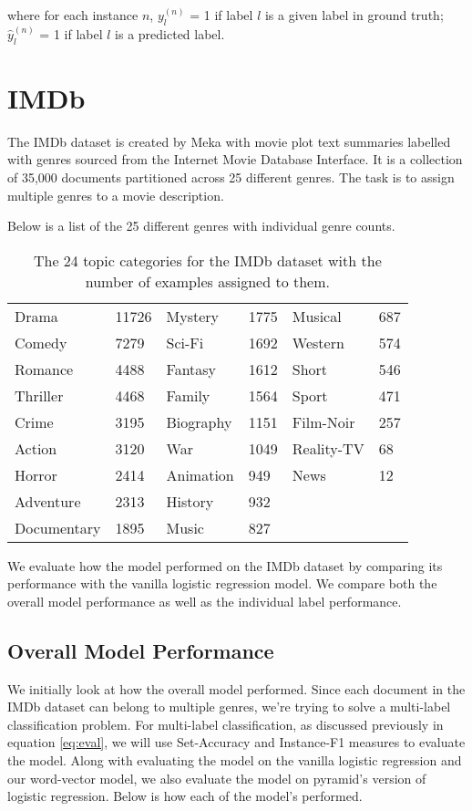 \noindent where for each instance $n$, $y^{(n)}_{l}$ = 1 if label $l$ is a given label in ground truth; \\
$\hat{y}^{(n)}_{l}$ = 1 if label $l$ is a predicted label.

\section{IMDb}

The IMDb dataset is created by Meka with movie plot text summaries labelled with genres sourced from the Internet Movie Database Interface. It is a collection of 35,000 documents partitioned across 25 different genres. The task is to assign multiple genres to a movie description.

Below is a list of the 25 different genres with individual genre counts.

\begin{table}[htbp]
\centering
\begin{tabular}{ll|ll|ll}
Drama & 11726 & Mystery & 1775 & Musical & 687 \\
Comedy & 7279 & Sci-Fi & 1692 & Western & 574 \\
Romance & 4488 & Fantasy & 1612 & Short & 546 \\
Thriller & 4468 & Family & 1564 & Sport & 471 \\
Crime & 3195 & Biography & 1151 & Film-Noir & 257 \\
Action & 3120 & War & 1049 & Reality-TV & 68 \\
Horror & 2414 & Animation & 949 & News & 12 \\
Adventure & 2313 & History & 932 &  &  \\
Documentary & 1895 & Music & 827 &  & 
\end{tabular}
\caption{\label{tab:widgets}The 24 topic categories for the IMDb dataset with the number of examples assigned to them.}
\end{table}

We evaluate how the model performed on the IMDb dataset by comparing its performance with the vanilla logistic regression model. We compare both the overall model performance as well as the individual label performance.

\subsection{Overall Model Performance}

We initially look at how the overall model performed. Since each document in the IMDb dataset can belong to multiple genres, we're trying to solve a multi-label classification problem. For multi-label classification, as discussed previously in equation \ref{eq:eval}, we will use Set-Accuracy and Instance-F1 measures to evaluate the model. Along with evaluating the model on the vanilla logistic regression and our word-vector model, we also evaluate the model on pyramid's version of logistic regression. Below is how each of the model's performed.

